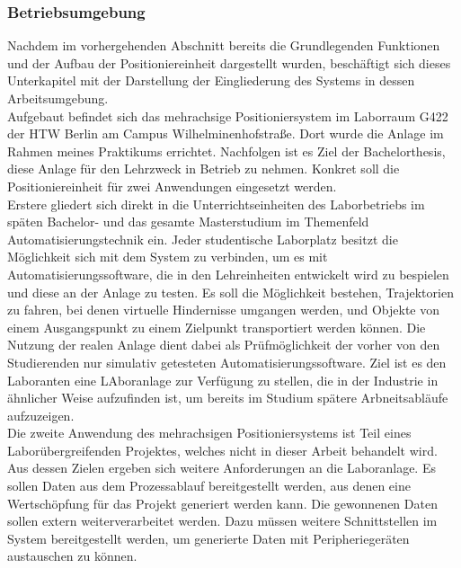 \documentclass[../Bachelorarbeit.tex]{subfiles}
\begin{document}
\subsubsection{Betriebsumgebung}
Nachdem im vorhergehenden Abschnitt bereits die Grundlegenden Funktionen und der Aufbau der Positioniereinheit dargestellt wurden, beschäftigt sich dieses Unterkapitel mit der Darstellung der Eingliederung des Systems in dessen Arbeitsumgebung.\\
Aufgebaut befindet sich das mehrachsige Positioniersystem im Laborraum G422 der HTW Berlin am Campus Wilhelminenhofstraße. Dort wurde die Anlage im Rahmen meines Praktikums errichtet. Nachfolgen ist es Ziel der Bachelorthesis, diese Anlage für den Lehrzweck in Betrieb zu nehmen. Konkret soll die Positioniereinheit für zwei Anwendungen eingesetzt werden.\\
Erstere gliedert sich direkt in die Unterrichtseinheiten des Laborbetriebs im späten Bachelor- und das gesamte Masterstudium im Themenfeld Automatisierungstechnik ein. Jeder studentische Laborplatz besitzt die Möglichkeit sich mit dem System zu verbinden, um es mit Automatisierungssoftware, die in den Lehreinheiten entwickelt wird zu bespielen und diese an der Anlage zu testen. Es soll die Möglichkeit bestehen, Trajektorien zu fahren, bei denen virtuelle Hindernisse umgangen werden, und Objekte von einem Ausgangspunkt zu einem Zielpunkt transportiert werden können. Die Nutzung der realen Anlage dient dabei als Prüfmöglichkeit der vorher von den Studierenden nur simulativ getesteten Automatisierungssoftware. Ziel ist es den Laboranten eine LAboranlage zur Verfügung zu stellen, die in der Industrie in ähnlicher Weise aufzufinden ist, um bereits im Studium spätere Arbneitsabläufe aufzuzeigen.\\
Die zweite Anwendung des mehrachsigen Positioniersystems ist Teil eines Laborübergreifenden Projektes, welches nicht in dieser Arbeit behandelt wird. Aus dessen Zielen ergeben sich weitere Anforderungen an die Laboranlage. Es sollen Daten aus dem Prozessablauf bereitgestellt werden, aus denen eine Wertschöpfung für das Projekt generiert werden kann. Die gewonnenen Daten sollen extern weiterverarbeitet werden. Dazu müssen weitere Schnittstellen im System bereitgestellt werden, um generierte Daten mit Peripheriegeräten austauschen zu können.
\end{document}
